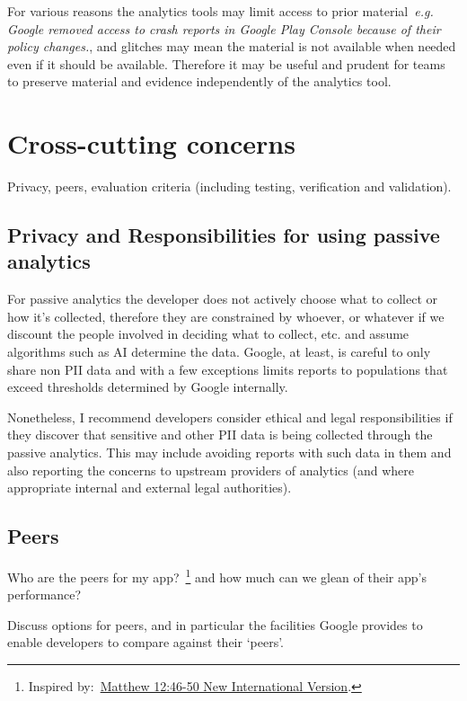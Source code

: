 For various reasons the analytics tools may limit access to prior material~\emph{e.g. Google removed access to crash reports in Google Play Console because of their policy changes.}, and glitches may mean the material is not available when needed even if it should be available. Therefore it may be useful and prudent for teams to preserve material and evidence independently of the analytics tool. 

\section{Cross-cutting concerns}
Privacy, peers, evaluation criteria (including testing, verification and validation).

\subsection{Privacy and Responsibilities for using passive analytics}
For passive analytics the developer does not actively choose what to collect or how it's collected, therefore they are constrained by whoever, or whatever if we discount the people involved in deciding what to collect, etc. and assume algorithms such as AI determine the data. Google, at least, is careful to only share non PII %
data and with a few exceptions limits reports to populations that exceed thresholds determined by Google internally. %

Nonetheless, I recommend developers consider ethical and legal responsibilities if they discover that sensitive and other PII data is being collected through the passive analytics. This may include avoiding reports with such data in them and also reporting the concerns to upstream providers of analytics (and where appropriate internal and external legal authorities).

\subsection{Peers}
Who are the peers for my app?~\footnote{Inspired by:~\href{https://www.biblegateway.com/passage/?search=Matthew\%2012:46-50&version=NIV}{Matthew 12:46-50 New International Version}.} and how much can we glean of their app's performance?

Discuss options for peers, and in particular the facilities Google provides to enable developers to compare against their `peers'.


